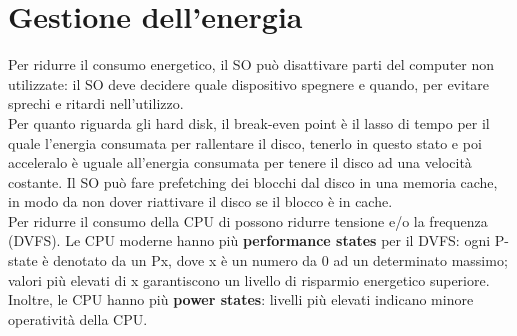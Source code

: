 \documentclass[12pt]{article}
\begin{document}
\section{Gestione dell'energia}
Per ridurre il consumo energetico, il SO può disattivare parti del computer non utilizzate: il SO deve decidere quale dispositivo 
spegnere e quando, per evitare sprechi e ritardi nell'utilizzo.\\
Per quanto riguarda gli hard disk, il break-even point è il lasso di tempo per il quale l'energia consumata per rallentare 
il disco, tenerlo in questo stato e poi acceleralo è uguale all'energia consumata per tenere il disco ad una velocità costante.
Il SO può fare prefetching dei blocchi dal disco in una memoria cache, in modo da non dover riattivare il disco se il blocco 
è in cache.\\
Per ridurre il consumo della CPU di possono ridurre tensione e/o la frequenza (DVFS). Le CPU moderne hanno più \textbf{performance 
states} per il DVFS: ogni P-state è denotato da un Px, dove x è un numero da 0 ad un determinato massimo; valori più elevati 
di x garantiscono un livello di risparmio energetico superiore. Inoltre, le CPU hanno più \textbf{power states}: livelli 
più elevati indicano minore operatività della CPU.
\end{document}
